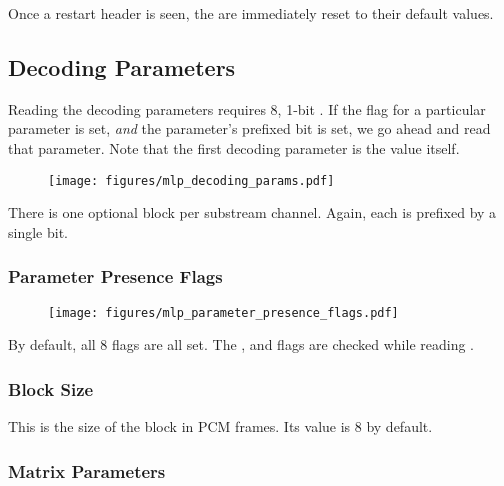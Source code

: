 Once a restart header is seen, the  are
immediately reset to their default values.

\clearpage

\subsection{Decoding Parameters}

Reading the decoding parameters requires 8, 1-bit
.
If the flag for a particular parameter is set,
\textit{and} the parameter's prefixed 
bit is set, we go ahead and read that parameter.
Note that the first decoding parameter is the 
value itself.

\begin{figure}[h]
\texttt{[image: figures/mlp\_decoding\_params.pdf]}
\end{figure}
\par
\noindent
There is one optional  block per
substream channel.
Again, each is prefixed by a single  bit.

\subsubsection{Parameter Presence Flags}

\begin{figure}[h]
\texttt{[image: figures/mlp\_parameter\_presence\_flags.pdf]}
\end{figure}
\par
\noindent
By default, all 8 flags are all set.
The ,  and
 flags are checked while
reading .

\subsubsection{Block Size}

This is the size of the block in PCM frames.
Its value is 8 by default.

\clearpage

\subsubsection{Matrix Parameters}


